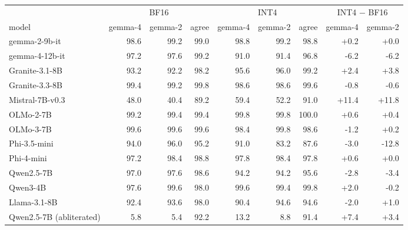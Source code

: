 \setlength{\tabcolsep}{3pt}
\begin{tabular}{@{}l rrr rrr rr@{}}
\toprule
& \multicolumn{3}{c}{BF16} & \multicolumn{3}{c}{INT4} & \multicolumn{2}{c}{INT4 $-$ BF16} \\
\cmidrule(lr){2-4}\cmidrule(lr){5-7}\cmidrule(lr){8-9}
model & gemma-4 & gemma-2 & agree & gemma-4 & gemma-2 & agree & gemma-4 & gemma-2 \\
\midrule
gemma-2-9b-it & 98.6 & 99.2 & 99.0 & 98.8 & 99.2 & 98.8 & +0.2 & +0.0 \\
gemma-4-12b-it & 97.2 & 97.6 & 99.2 & 91.0 & 91.4 & 96.8 & -6.2 & -6.2 \\
Granite-3.1-8B & 93.2 & 92.2 & 98.2 & 95.6 & 96.0 & 99.2 & +2.4 & +3.8 \\
Granite-3.3-8B & 99.4 & 99.2 & 99.8 & 98.6 & 98.6 & 99.6 & -0.8 & -0.6 \\
Mistral-7B-v0.3 & 48.0 & 40.4 & 89.2 & 59.4 & 52.2 & 91.0 & +11.4 & +11.8 \\
OLMo-2-7B & 99.2 & 99.4 & 99.4 & 99.8 & 99.8 & 100.0 & +0.6 & +0.4 \\
OLMo-3-7B & 99.6 & 99.6 & 99.6 & 98.4 & 99.8 & 98.6 & -1.2 & +0.2 \\
Phi-3.5-mini & 94.0 & 96.0 & 95.2 & 91.0 & 83.2 & 87.6 & -3.0 & -12.8 \\
Phi-4-mini & 97.2 & 98.4 & 98.8 & 97.8 & 98.4 & 97.8 & +0.6 & +0.0 \\
Qwen2.5-7B & 97.0 & 97.6 & 98.6 & 94.2 & 94.2 & 95.6 & -2.8 & -3.4 \\
Qwen3-4B & 97.6 & 99.6 & 98.0 & 99.6 & 99.4 & 99.8 & +2.0 & -0.2 \\
Llama-3.1-8B & 92.4 & 93.6 & 98.0 & 90.4 & 94.6 & 94.6 & -2.0 & +1.0 \\
Qwen2.5-7B (abliterated) & 5.8 & 5.4 & 92.2 & 13.2 & 8.8 & 91.4 & +7.4 & +3.4 \\
\bottomrule
\end{tabular}
